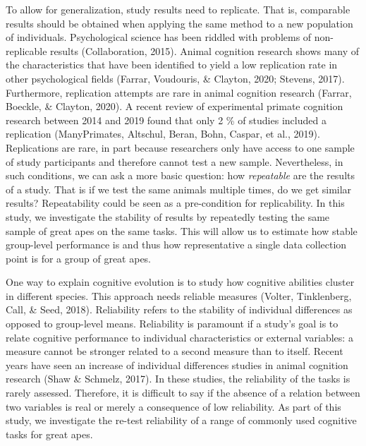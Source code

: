 \documentclass[10pt, letterpaper]{article}
\begin{document}
To allow for generalization, study results need to replicate. That is,
comparable results should be obtained when applying the same method to a
new population of individuals. Psychological science has been riddled
with problems of non-replicable results (Collaboration, 2015). Animal
cognition research shows many of the characteristics that have been
identified to yield a low replication rate in other psychological fields
(Farrar, Voudouris, \& Clayton, 2020; Stevens, 2017). Furthermore,
replication attempts are rare in animal cognition research (Farrar,
Boeckle, \& Clayton, 2020). A recent review of experimental primate
cognition research between 2014 and 2019 found that only 2 \% of studies
included a replication (ManyPrimates, Altschul, Beran, Bohn, Caspar, et
al., 2019). Replications are rare, in part because researchers only have
access to one sample of study participants and therefore cannot test a
new sample. Nevertheless, in such conditions, we can ask a more basic
question: how \emph{repeatable} are the results of a study. That is if
we test the same animals multiple times, do we get similar results?
Repeatability could be seen as a pre-condition for replicability. In
this study, we investigate the stability of results by repeatedly
testing the same sample of great apes on the same tasks. This will allow
us to estimate how stable group-level performance is and thus how
representative a single data collection point is for a group of great
apes.

One way to explain cognitive evolution is to study how cognitive
abilities cluster in different species. This approach needs reliable
measures (Volter, Tinklenberg, Call, \& Seed, 2018). Reliability refers
to the stability of individual differences as opposed to group-level
means. Reliability is paramount if a study's goal is to relate cognitive
performance to individual characteristics or external variables: a
measure cannot be stronger related to a second measure than to itself.
Recent years have seen an increase of individual differences studies in
animal cognition research (Shaw \& Schmelz, 2017). In these studies, the
reliability of the tasks is rarely assessed. Therefore, it is difficult
to say if the absence of a relation between two variables is real or
merely a consequence of low reliability. As part of this study, we
investigate the re-test reliability of a range of commonly used
cognitive tasks for great apes.
\end{document}
